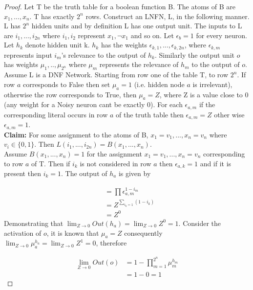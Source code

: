 \begin{proof}
Let T be the truth table for a boolean function B. The atoms of B are $x_1, ..., x_n$. T has exactly $2^n$ rows. Construct an LNFN, L, in the following manner. L has $2^n$ hidden units and by definition L has one output unit. The inputs to L are $i_1, ..., i_{2n}$ where $i_1, i_2$ represent $x_1, \lnot x_1$ and so on. Let $\epsilon_b = 1$ for every neuron.\\

Let $h_k$ denote hidden unit k. $h_k$ has the weights $\epsilon_{k,1}, ..., \epsilon_{k,2n}$, where $\epsilon_{k, m}$ represents input $i_m$'s relevance to the output of $h_k$. Similarly the output unit $o$ has weights $\mu_1, .., \mu_{2^n}$ where $\mu_m$ represents the relevance of $h_m$ to the output of $o$.\\

Assume L is a DNF Network. Starting from row one of the table T, to row $2^n$. If row $a$ corresponds to False then set $\mu_a = 1$ (i.e. hidden node $a$ is irrelevant), otherwise the row corresponds to True, then $\mu_a = Z$, where Z is a value close to 0 (any weight for a Noisy neuron cant be exactly 0). For each $\epsilon_{a, m}$ if the corresponding literal occurs in row $a$ of the truth table then $\epsilon_{a, m} = Z$ other wise $\epsilon_{a, m} = 1$.\\

\textbf{Claim:} For some assignment to the atoms of B, $x_1 = v_1, ..., x_n = v_n$ where $v_i \in \{0, 1\}$. Then $L(i_1, ..., i_{2n}) = B(x_1, ..., x_n)$.\\

Assume $B(x_1, ..., x_n) = 1$ for the assignment $x_1 = v_1, ..., x_n = v_n$ corresponding to row $a$ of T. Then if $i_k$ is not considered in row $a$ then $\epsilon_{a,k} = 1$ and if it is present then $i_k = 1$. The output of $h_a$ is given by 

\begin{align*}
&= \prod \epsilon_{a, m}^{1 - i_m}\\
&= Z^{\sum_{i_k = 1}(1 - i_k)}\\
&= Z^0
\end{align*}
Demonstrating that  $\lim_{Z \to 0} Out(h_a) = \lim_{Z \to 0} Z^0 = 1$. Consider the activation of $o$, it is known that $\mu_a = Z$ consequently $\lim_{Z \to 0} \mu_a^{h_a} = \lim_{Z \to 0} Z^1 = 0$, therefore

\begin{align}
\lim_{Z \to 0} Out(o) &= 1 - \prod_{m=1}^{2^n} \mu_m ^{h_m}\\
&= 1 - 0 = 1
\end{align} 


\end{proof}
